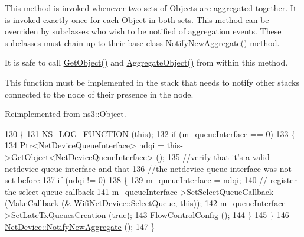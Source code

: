 This method is invoked whenever two sets of Objects are aggregated together. It is invoked exactly once for each \hyperlink{classns3_1_1Object}{Object} in both sets. This method can be overriden by subclasses who wish to be notified of aggregation events. These subclasses must chain up to their base class \hyperlink{classns3_1_1WifiNetDevice_a5da4bde5eeb1ed73df9753faddefe5bb}{Notify\+New\+Aggregate()} method.

It is safe to call \hyperlink{classns3_1_1Object_a13e18c00017096c8381eb651d5bd0783}{Get\+Object()} and \hyperlink{classns3_1_1Object_a79dd435d300f3deca814553f561a2922}{Aggregate\+Object()} from within this method.

This function must be implemented in the stack that needs to notify other stacks connected to the node of their presence in the node. 

Reimplemented from \hyperlink{classns3_1_1Object_a1bd7211125185a6cd511c35fea4e500f}{ns3\+::\+Object}.


\begin{DoxyCode}
130 \{
131   \hyperlink{log-macros-disabled_8h_a90b90d5bad1f39cb1b64923ea94c0761}{NS\_LOG\_FUNCTION} (\textcolor{keyword}{this});
132   \textcolor{keywordflow}{if} (\hyperlink{classns3_1_1WifiNetDevice_a68bbd158f4112a8ea7edc759783cb333}{m\_queueInterface} == 0)
133     \{
134       Ptr<NetDeviceQueueInterface> ndqi = this->GetObject<NetDeviceQueueInterface> ();
135       \textcolor{comment}{//verify that it's a valid netdevice queue interface and that}
136       \textcolor{comment}{//the netdevice queue interface was not set before}
137       \textcolor{keywordflow}{if} (ndqi != 0)
138         \{
139           \hyperlink{classns3_1_1WifiNetDevice_a68bbd158f4112a8ea7edc759783cb333}{m\_queueInterface} = ndqi;
140           \textcolor{comment}{// register the select queue callback}
141           \hyperlink{classns3_1_1WifiNetDevice_a68bbd158f4112a8ea7edc759783cb333}{m\_queueInterface}->SetSelectQueueCallback (\hyperlink{group__makecallbackmemptr_ga9376283685aa99d204048d6a4b7610a4}{MakeCallback} (&
      \hyperlink{classns3_1_1WifiNetDevice_a12abdbf8bfe800f2110784db3efd8e6b}{WifiNetDevice::SelectQueue}, \textcolor{keyword}{this}));
142           \hyperlink{classns3_1_1WifiNetDevice_a68bbd158f4112a8ea7edc759783cb333}{m\_queueInterface}->SetLateTxQueuesCreation (\textcolor{keyword}{true});
143           \hyperlink{classns3_1_1WifiNetDevice_af84ee4b2942924a3e819a2a98b891e69}{FlowControlConfig} ();
144         \}
145     \}
146   \hyperlink{classns3_1_1Object_a1bd7211125185a6cd511c35fea4e500f}{NetDevice::NotifyNewAggregate} ();
147 \}
\end{DoxyCode}


